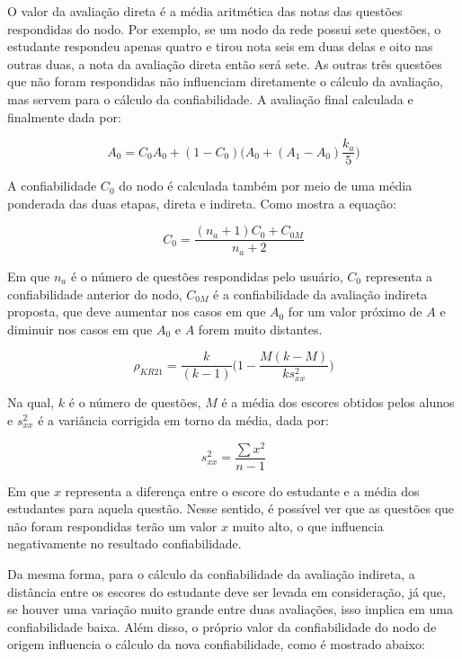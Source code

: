 O valor da avaliação direta é a média aritmética das notas das questões respondidas do nodo. Por exemplo, se um nodo da rede possui sete questões, o estudante respondeu apenas quatro e tirou nota seis em duas delas e oito nas outras duas, a nota da avaliação direta então será sete. As outras três questões que não foram respondidas não influenciam diretamente o cálculo da avaliação, mas servem para o cálculo da confiabilidade. A avaliação final calculada e finalmente dada por:

\begin{equation}
	 A_{0}=C_{0} A_{0} + (1- C_{0}) \bigg( A_{0}+(A_{1}-A_{0}) \frac{k_{a}}{5} \bigg)
\end{equation}

A confiabilidade \(C_{0}\) do nodo é calculada também por meio de uma média ponderada das duas etapas, direta e indireta. Como mostra a equação:

\begin{equation}
	C_{0}= \frac{(n_a+1) C_0+C_{0M}}{n_a+2}
\end{equation}

Em que \(n_a\) é o número de questões respondidas pelo usuário, \(C_0\) representa a confiabilidade anterior do nodo, \(C_{0M}\) é a confiabilidade da avaliação indireta proposta, que deve aumentar nos casos em que \(A_0\) for um valor próximo de \(A\) e diminuir nos casos em que \(A_0\) e \(A\) forem muito distantes.

\begin{equation}
	\rho_{KR21} = \frac{k}{(k-1)} \bigg(1- \frac{M(k-M)}{ks_{xx}^{2}} \bigg) 
\end{equation}

Na qual, \(k\) é o número de questões, \(M\) é a média dos escores obtidos pelos alunos e \(s_{xx}^{2}\) é a variância corrigida em torno da média, dada por:

\begin{equation}
	s_{xx}^{2} =  \frac{\sum{x^2}}{n-1}
\end{equation}

Em que \(x\) representa a diferença entre o escore do estudante e a média dos estudantes para aquela questão. Nesse sentido, é possível ver que as questões que não foram respondidas terão um valor \(x\) muito alto, o que influencia negativamente no resultado confiabilidade.
	
Da mesma forma, para o cálculo da confiabilidade da avaliação indireta, a distância entre os escores do estudante deve ser levada em consideração, já que, se houver uma variação muito grande entre duas avaliações, isso implica em uma confiabilidade baixa. Além disso, o próprio valor da confiabilidade do nodo de origem influencia o cálculo da nova confiabilidade, como é mostrado abaixo:

